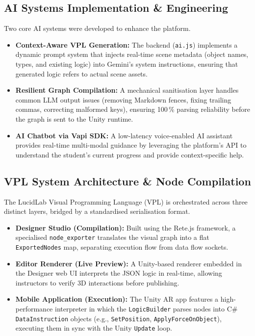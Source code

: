 \documentclass[12pt,a4paper]{article}
\begin{document}
\subsection{AI Systems Implementation \& Engineering}

Two core AI systems were developed to enhance the platform.

\begin{itemize}[leftmargin=1.4cm]
  \item \textbf{Context-Aware VPL Generation:} The backend (\texttt{ai.js}) implements
        a dynamic prompt system that injects real-time scene metadata (object names,
        types, and existing logic) into Gemini's system instructions, ensuring that
        generated logic refers to actual scene assets.
  \item \textbf{Resilient Graph Compilation:} A mechanical sanitisation layer handles
        common LLM output issues (removing Markdown fences, fixing trailing commas,
        correcting malformed keys), ensuring 100\,\% parsing reliability before the
        graph is sent to the Unity runtime.
  \item \textbf{AI Chatbot via Vapi SDK:} A low-latency voice-enabled AI assistant
        provides real-time multi-modal guidance by leveraging the platform's API to
        understand the student's current progress and provide context-specific help.
\end{itemize}

\subsection{VPL System Architecture \& Node Compilation}

The LucidLab Visual Programming Language (VPL) is orchestrated across three distinct
layers, bridged by a standardised serialisation format.

\begin{itemize}[leftmargin=1.4cm]
  \item \textbf{Designer Studio (Compilation):} Built using the Rete.js framework, a
        specialised \texttt{node\_exporter} translates the visual graph into a flat
        \texttt{ExportedNodes} map, separating execution flow from data flow sockets.
  \item \textbf{Editor Renderer (Live Preview):} A Unity-based renderer embedded in the
        Designer web UI interprets the JSON logic in real-time, allowing instructors to
        verify 3D interactions before publishing.
  \item \textbf{Mobile Application (Execution):} The Unity AR app features a
        high-performance interpreter in which the \texttt{LogicBuilder} parses nodes
        into C\# \texttt{DataInstruction} objects (e.g., \texttt{SetPosition},
        \texttt{ApplyForceOnObject}), executing them in sync with the Unity
        \texttt{Update} loop.
\end{itemize}
\end{document}
